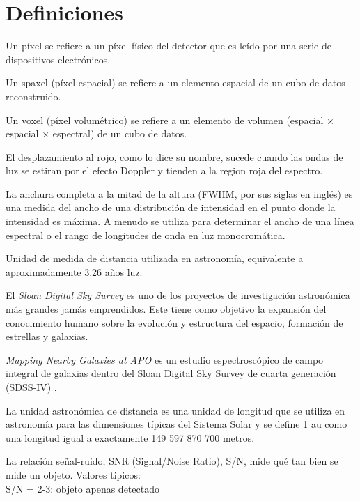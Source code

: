 \documentclass[9pt,twocolumn,a4paper]{opticajnl}
\begin{document}
\section*{Definiciones}
\begin{description}[style=nextline]
  \item[pixel] Un píxel se refiere a un píxel físico del detector que es leído por una serie de dispositivos electrónicos.
  \item[spaxel] Un spaxel (píxel espacial) se refiere a un elemento espacial de un cubo de datos reconstruido.
  \item[voxel] Un voxel (píxel volumétrico) se refiere a un elemento de volumen (espacial × espacial × espectral) de un cubo de datos. 
  \item[redshift] El desplazamiento al rojo, como lo dice su nombre, sucede cuando las ondas de luz se estiran por el efecto Doppler y tienden a la region roja del espectro.
  \item[FWHM]La anchura completa a la mitad de la altura (FWHM, por sus siglas en inglés) es una medida del ancho de una distribución de intensidad en el punto donde la intensidad es máxima. A menudo se utiliza para determinar el ancho de una línea espectral o el rango de longitudes de onda en luz monocromática. 
  \item[pársec] Unidad de medida de distancia utilizada en astronomía, equivalente a aproximadamente 3.26 años luz.
  \item[SDSS] El \textit{Sloan Digital Sky Survey} es uno de los proyectos de investigación astronómica más grandes jamás emprendidos. Este tiene como objetivo la expansión del conocimiento humano sobre la evolución y estructura del espacio, formación de estrellas y galaxias.
  \item[MaNGA] \textit{Mapping Nearby Galaxies at APO} es un estudio espectroscópico de campo integral de galaxias dentro del Sloan Digital Sky Survey de cuarta generación (SDSS-IV) \cite{weijmans2015manga}.
  \item[Unidad Astronomica / au] La unidad astronómica de distancia es una unidad de longitud que se utiliza en astronomía para las dimensiones típicas del Sistema Solar y se define 1 au como una longitud igual a exactamente 149 597 870 700 metros.
  \item[S/N] La relación señal-ruido, SNR (Signal/Noise Ratio), S/N, mide qué tan bien se mide un objeto. Valores tipicos:\\
  S/N = 2-3: objeto apenas detectado\\

\end{description}
\end{document}
